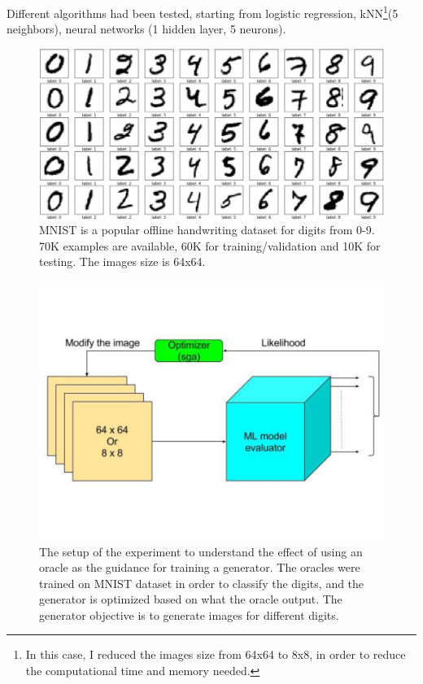     Different algorithms had been tested, starting from logistic regression, kNN\footnote{In this case, I reduced the images size from 64x64 to 8x8, in order to reduce the computational time and memory needed.}(5 neighbors), neural networks (1 hidden layer, 5 neurons).

    \begin{figure}[!htbp]
      \centering
      \includegraphics[scale=0.4]{images/adv_attack/mnist.png}
      \caption{MNIST is a popular offline handwriting dataset for digits from 0-9. 70K examples are available, 60K for training/validation and 10K for testing. The images size is 64x64.}
      \label{fig:mnist}
    \end{figure}

    \begin{figure}[!htbp]
      \centering
      \includegraphics[scale=0.4]{images/adv_attack/adversarial_optimization.png}
      \caption{The setup of the experiment to understand the effect of using an oracle as the guidance for training a generator. The oracles were trained on MNIST dataset in order to classify the digits, and the generator is optimized based on what the oracle output. The generator objective is to generate images for different digits.}
      \label{fig:adversarial_exp_setup}
    \end{figure}

